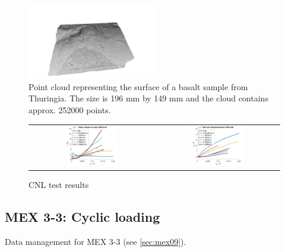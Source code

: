 \begin{figure}[!ht]
\begin{center}
\includegraphics[width=0.5\textwidth]{./figures/MEX3-2PointCloud.png}
\end{center}
\caption{Point cloud representing the surface of a basalt sample from Thuringia. The size is 196 mm by 149 mm and the cloud contains approx. 252000 points.}
\label{fig:DataCNSBasaltPointCloud}
\end{figure}

\begin{figure}[!ht]
\begin{tabular}{cc}
\includegraphics[width=0.45\textwidth]{./figures/CNSShearCurvesAll.png}     
& 
\includegraphics[width=0.45\textwidth]{./figures/CNSDilatationAll.png} 
\end{tabular}
\caption{CNL test results}
\label{fig:DataCNSBasaltLab}
\end{figure}


\subsection{MEX 3-3: Cyclic loading}

Data management for MEX 3-3 (see \ref{sec:mex09}).

